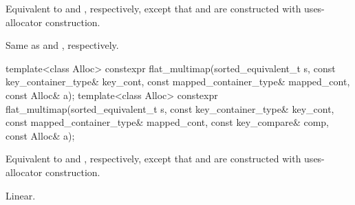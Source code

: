 \begin{itemdescr}
\pnum
\effects
Equivalent to  and
, respectively,
except that  and  are constructed
with uses-allocator construction.

\pnum
\complexity
Same as  and
, respectively.
\end{itemdescr}

%
\begin{itemdecl}
template<class Alloc>
  constexpr flat_multimap(sorted_equivalent_t s, const key_container_type& key_cont,
                const mapped_container_type& mapped_cont, const Alloc& a);
template<class Alloc>
  constexpr flat_multimap(sorted_equivalent_t s, const key_container_type& key_cont,
                const mapped_container_type& mapped_cont, const key_compare& comp,
                const Alloc& a);
\end{itemdecl}

\begin{itemdescr}
\pnum
\effects
Equivalent to  and
, respectively,
except that  and  are constructed
with uses-allocator construction.

\pnum
\complexity
Linear.
\end{itemdescr}

